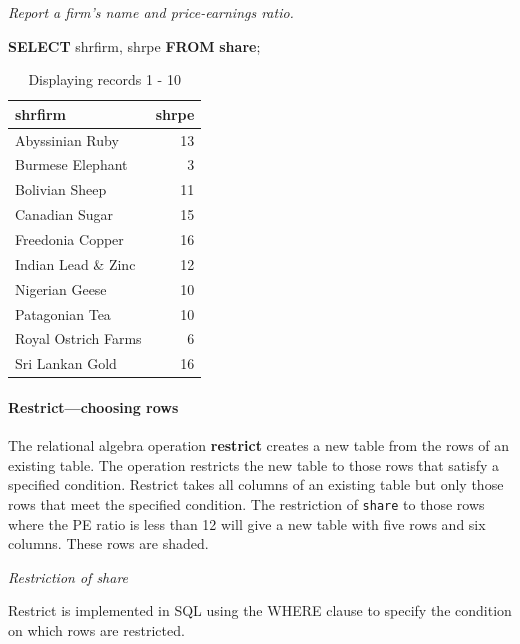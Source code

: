 \documentclass[
]{article}
\newenvironment{Shaded}{\begin{snugshade}}{\end{snugshade}}
\newcommand{\KeywordTok}[1]{\textcolor[rgb]{0.13,0.29,0.53}{\textbf{#1}}}
\newcommand{\NormalTok}[1]{#1}
\begin{document}
\emph{Report a firm's name and price-earnings ratio.}

\begin{Shaded}
\begin{Highlighting}[]
\KeywordTok{SELECT}\NormalTok{ shrfirm, shrpe }\KeywordTok{FROM} \KeywordTok{share}\NormalTok{;}
\end{Highlighting}
\end{Shaded}

\begin{table}

\caption{\label{tab:unnamed-chunk-7}Displaying records 1 - 10}
\centering
\begin{tabular}[t]{l|r}
\hline
shrfirm & shrpe\\
\hline
Abyssinian Ruby & 13\\
\hline
Burmese Elephant & 3\\
\hline
Bolivian Sheep & 11\\
\hline
Canadian Sugar & 15\\
\hline
Freedonia Copper & 16\\
\hline
Indian Lead \& Zinc & 12\\
\hline
Nigerian Geese & 10\\
\hline
Patagonian Tea & 10\\
\hline
Royal Ostrich Farms & 6\\
\hline
Sri Lankan Gold & 16\\
\hline
\end{tabular}
\end{table}

\hypertarget{restrictchoosing-rows}{%
\paragraph*{Restrict---choosing rows}\label{restrictchoosing-rows}}

The relational algebra operation \textbf{restrict} creates a new table from the rows of an existing table. The operation restricts the new table to those rows that satisfy a specified condition. Restrict takes all columns of an existing table but only those rows that meet the specified condition. The restriction of \texttt{share} to those rows where the PE ratio is less than 12 will give a new table with five rows and six columns. These rows are shaded.

\emph{Restriction of share}

Restrict is implemented in SQL using the WHERE clause to specify the condition on which rows are restricted.
\end{document}

